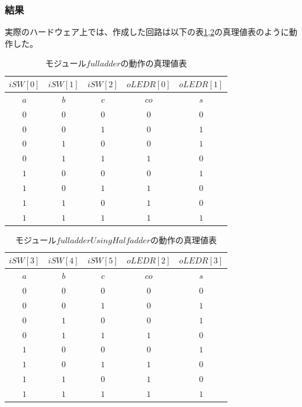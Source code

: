 \documentclass[a4paper]{jarticle}
\begin{document}
\subsubsection{結果}
実際のハードウェア上では、作成した回路は以下の表\ref{Work5FullAdderTruthTable},\ref{Work5FullAdderUsingHalfAdderTruthTable}の真理値表のように動作した。
\begin{table}[!h]
	\begin{center}
		\caption{モジュール$fulladder$の動作の真理値表}
		\label{Work5FullAdderTruthTable}
		\begin{tabular}{|c|c|c|c|c|}
			\hline
			$iSW \left[ 0 \right]$	&$iSW \left[ 1 \right]$	&$iSW \left[ 2 \right]$	&$oLEDR \left[ 0 \right]$	&$oLEDR \left[ 1 \right]$\\	\hline\hline
			$a$			&$b$			&$c$			&$co$				&$s$\\				\hline\hline
			$0$			&$0$			&$0$			&$0$				&$0$\\				\hline
			$0$			&$0$			&$1$			&$0$				&$1$\\				\hline
			$0$			&$1$			&$0$			&$0$				&$1$\\				\hline
			$0$			&$1$			&$1$			&$1$				&$0$\\				\hline
			$1$			&$0$			&$0$			&$0$				&$1$\\				\hline
			$1$			&$0$			&$1$			&$1$				&$0$\\				\hline
			$1$			&$1$			&$0$			&$1$				&$0$\\				\hline
			$1$			&$1$			&$1$			&$1$				&$1$\\				\hline
		\end{tabular}
	\end{center}
\end{table}
\begin{table}[!h]
	\begin{center}
		\caption{モジュール$fulladderUsingHalfadder$の動作の真理値表}
		\label{Work5FullAdderUsingHalfAdderTruthTable}
		\begin{tabular}{|c|c|c|c|c|}
			\hline
			$iSW \left[ 3 \right]$	&$iSW \left[ 4 \right]$	&$iSW \left[ 5 \right]$	&$oLEDR \left[ 2 \right]$	&$oLEDR \left[ 3 \right]$\\	\hline\hline
			$a$			&$b$			&$c$			&$co$				&$s$\\				\hline\hline
			$0$			&$0$			&$0$			&$0$				&$0$\\				\hline
			$0$			&$0$			&$1$			&$0$				&$1$\\				\hline
			$0$			&$1$			&$0$			&$0$				&$1$\\				\hline
			$0$			&$1$			&$1$			&$1$				&$0$\\				\hline
			$1$			&$0$			&$0$			&$0$				&$1$\\				\hline
			$1$			&$0$			&$1$			&$1$				&$0$\\				\hline
			$1$			&$1$			&$0$			&$1$				&$0$\\				\hline
			$1$			&$1$			&$1$			&$1$				&$1$\\				\hline
		\end{tabular}
	\end{center}
\end{table}
\end{document}
